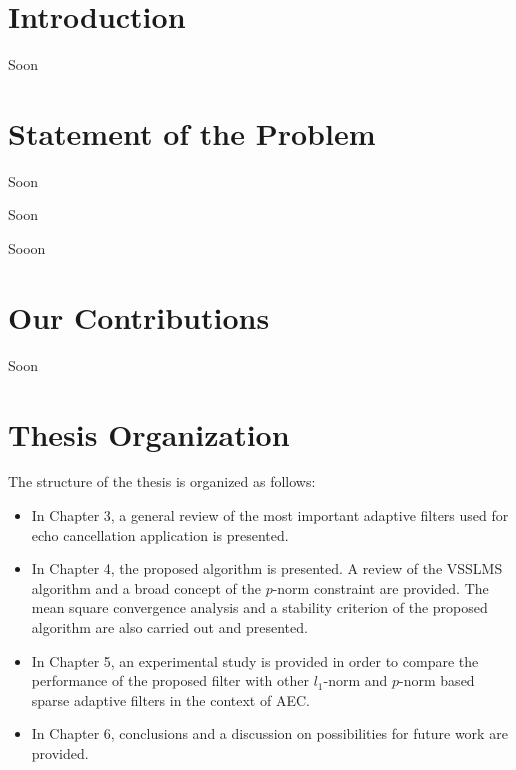 \section{Introduction}\label{sec:2.1}
\vspace{-0.5cm}
\noindent Soon
\vspace{-0.3cm}
\section{Statement of the Problem}\label{sec:2.2}
\vspace{-0.5cm}
\noindent Soon

\vspace{-0.5cm}
\par
\noindent Soon

\vspace{-0.5cm}
\par
\noindent Sooon 


\vspace{-0.3cm}
\section{Our Contributions}\label{sec:2.3}
\vspace{-0.5cm}

\noindent Soon

\vspace{-0.3cm}
\section{Thesis Organization}\label{sec:2.4}
\vspace{-0.5cm}
\noindent The structure of the thesis is organized as follows:

\vspace{-0.8cm}
\begin{itemize}
  \item  In Chapter 3, a general review of the most important adaptive filters used for echo cancellation application is presented. %
\vspace{-0.3cm}
  \item In Chapter 4, the proposed algorithm is presented. A review of the VSSLMS algorithm and a broad concept of the $p$-norm constraint are provided. The mean square convergence analysis and a stability criterion of the proposed algorithm are also carried out and presented.
\vspace{-0.3cm}
  \item In Chapter 5, an experimental study is provided in order to compare the performance of the proposed filter with other $l_1$-norm and $p$-norm based sparse adaptive filters  in the context of AEC.
\vspace{-0.3cm}
  \item In Chapter 6, conclusions and a discussion on possibilities for future work are provided.
\end{itemize}

\vspace{-0.5cm}
